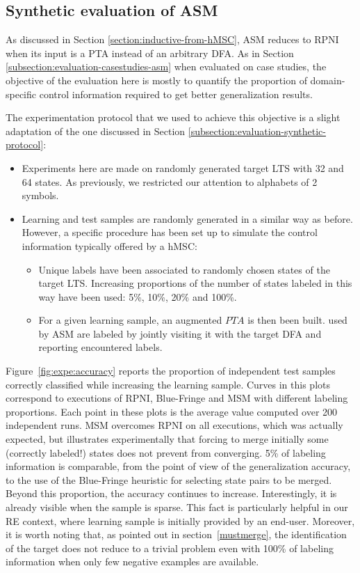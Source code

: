 \subsection{Synthetic evaluation of ASM}

As discussed in Section \ref{section:inductive-from-hMSC}, ASM reduces to RPNI when its input is a PTA instead of an arbitrary DFA. As in Section \ref{subsection:evaluation-casestudies-asm} when evaluated on case studies, the objective of the evaluation here is mostly to quantify the proportion of domain-specific control information required to get better generalization results. 

The experimentation protocol that we used to achieve this objective is a slight adaptation of the one discussed in Section \ref{subsection:evaluation-synthetic-protocol}:
\begin{itemize}

\item Experiments here are made on randomly generated target LTS with 32 and 64 states. As previously, we restricted our attention to alphabets of 2 symbols.

\item Learning and test samples are randomly generated in a similar way as before. However, a specific procedure has been set up to simulate the control information typically offered by a hMSC:
\begin{itemize}

\item Unique labels have been associated to randomly chosen states of the target LTS. Increasing proportions of the number of states labeled in this way have been used: 5\%, 10\%, 20\% and 100\%.

\item For a given learning sample, an augmented $PTA$ is then been built. used by ASM are labeled by jointly visiting it with the target DFA and reporting encountered labels.
\end{itemize}
\end{itemize}
 
Figure~\ref{fig:expe:accuracy} reports the proportion of independent test samples correctly classified while increasing the learning sample. Curves in this plots correspond to executions of RPNI, Blue-Fringe and MSM with different labeling proportions. Each point in these plots is the average value computed over 200 independent runs. MSM overcomes RPNI on all executions, which was actually expected, but illustrates experimentally that forcing to merge initially some (correctly labeled!) states does not prevent from converging. 5\% of labeling information is comparable, from the point of view of the generalization accuracy, to the use of the Blue-Fringe heuristic for selecting state pairs to be merged. Beyond this proportion, the accuracy continues to increase. Interestingly, it is already visible when the sample is sparse. This fact is particularly helpful in our RE context, where learning sample is initially provided by an end-user.
Moreover, it is worth noting that, as pointed out in section~\ref{mustmerge}, the identification of the target does not reduce to a trivial problem even with 100\% of labeling information when only few negative examples are available. 

